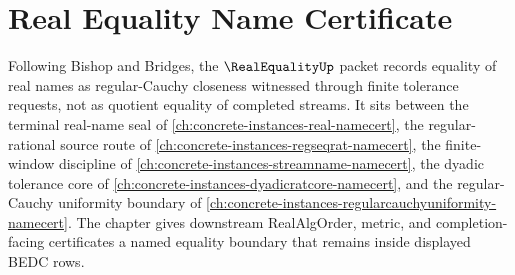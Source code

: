 \chapter{Real Equality Name Certificate}
\label{ch:concrete-instances-real-equality-namecert}

Following Bishop and Bridges, the $\RealEqualityUp$ packet records equality of real names as regular-Cauchy closeness witnessed through finite tolerance requests, not as quotient equality of completed streams. It sits between the terminal real-name seal of \autoref{ch:concrete-instances-real-namecert}, the regular-rational source route of \autoref{ch:concrete-instances-regseqrat-namecert}, the finite-window discipline of \autoref{ch:concrete-instances-streamname-namecert}, the dyadic tolerance core of \autoref{ch:concrete-instances-dyadicratcore-namecert}, and the regular-Cauchy uniformity boundary of \autoref{ch:concrete-instances-regularcauchyuniformity-namecert}. The chapter gives downstream RealAlgOrder, metric, and completion-facing certificates a named equality boundary that remains inside displayed BEDC rows.

